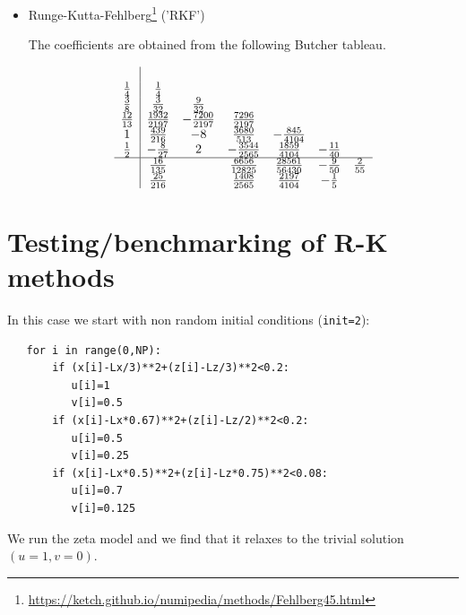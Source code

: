 \begin{itemize}
\item Runge-Kutta-Fehlberg\footnote{\url{https://ketch.github.io/numipedia/methods/Fehlberg45.html}} ('RKF')

The coefficients are obtained from the following Butcher tableau.

\begin{align} 
\begin{array}{c|cccccc} 
& & & & & & \\ 
\frac{1}{4} & \frac{1}{4} & & & & & \\ 
\frac{3}{8} & \frac{3}{32} & \frac{9}{32} & & & & \\ 
\frac{12}{13} & \frac{1932}{2197} & - \frac{7200}{2197} & \frac{7296}{2197} & & & \\ 
1 & \frac{439}{216} & -8 & \frac{3680}{513} & - \frac{845}{4104} & & \\ 
\frac{1}{2} & - \frac{8}{27} & 2 & - \frac{3544}{2565} & \frac{1859}{4104} & - \frac{11}{40} & \\ 
\hline & \frac{16}{135} & & \frac{6656}{12825} & \frac{28561}{56430} & - \frac{9}{50} & \frac{2}{55}\\ 
& \frac{25}{216} & & \frac{1408}{2565} & \frac{2197}{4104} & - \frac{1}{5} & 
\end{array}
\end{align}





\end{itemize}



\newpage
\section*{Testing/benchmarking of R-K methods}

In this case we start with non random initial conditions (\lstinline{init=2}):
\begin{lstlisting}
   for i in range(0,NP):
       if (x[i]-Lx/3)**2+(z[i]-Lz/3)**2<0.2:
          u[i]=1
          v[i]=0.5
       if (x[i]-Lx*0.67)**2+(z[i]-Lz/2)**2<0.2:
          u[i]=0.5
          v[i]=0.25
       if (x[i]-Lx*0.5)**2+(z[i]-Lz*0.75)**2<0.08:
          u[i]=0.7
          v[i]=0.125
\end{lstlisting}

We run the zeta model and we find that it relaxes to the trivial solution $(u=1,v=0)$.

